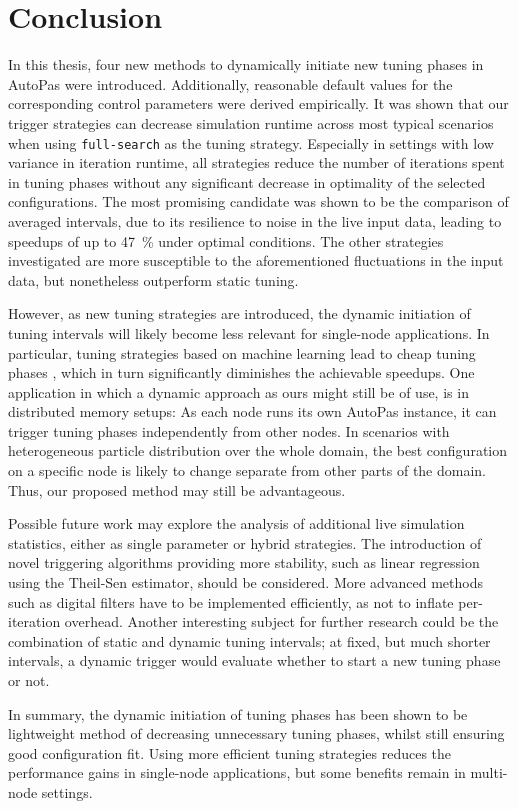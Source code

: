 \chapter[Conclusion]{Conclusion}
\label{cp:conclusion}

\vspace*{-2ex} %
In this thesis, four new methods to dynamically initiate new tuning phases in AutoPas were introduced. Additionally, reasonable default values for the corresponding control parameters were derived empirically.
It was shown that our trigger strategies can decrease simulation runtime across most typical scenarios when using \texttt{full-search} as the tuning strategy.
Especially in settings with low variance in iteration runtime, all strategies reduce the number of iterations spent in tuning phases without any significant decrease in optimality of the selected configurations. %
The most promising candidate was shown to be the comparison of averaged intervals, due to its resilience to noise in the live input data, leading to speedups of up to \qty{47}{\percent} under optimal conditions.
The other strategies investigated are more susceptible to the aforementioned fluctuations in the input data, but nonetheless outperform static tuning. %

However, as new tuning strategies are introduced, the dynamic initiation of tuning intervals will likely become less relevant for single-node applications. In particular, tuning strategies based on machine learning lead to cheap tuning phases \cite{Newcome2025}, which in turn significantly diminishes the achievable speedups. One application in which a dynamic approach as ours might still be of use, is in distributed memory setups: As each node runs its own AutoPas instance, it can trigger tuning phases independently from other nodes. In scenarios with heterogeneous particle distribution over the whole domain, the best configuration on a specific node is likely to change separate from other parts of the domain. Thus, our proposed method may still be advantageous.

Possible future work may explore the analysis of additional live simulation statistics, either as single parameter or hybrid strategies. The introduction of novel triggering algorithms providing more stability, such as linear regression using the Theil-Sen estimator, should be considered. More advanced methods such as digital filters have to be implemented efficiently, as not to inflate per-iteration overhead.
Another interesting subject for further research could be the combination of static and dynamic tuning intervals; at fixed, but much shorter intervals, a dynamic trigger would evaluate whether to start a new tuning phase or not.

In summary, the dynamic initiation of tuning phases has been shown to be lightweight method of decreasing unnecessary tuning phases, whilst still ensuring good configuration fit. Using more efficient tuning strategies reduces the performance gains in single-node applications, but some benefits remain in multi-node settings.

